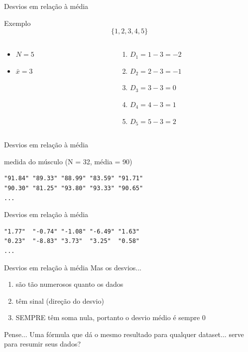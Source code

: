 \documentclass{beamer}
\begin{document}
\begin{frame}{\scriptsize Desvios em relação à média}
\begin{exampleblock}{Exemplo}
    \footnotesize
  \begin{displaymath}
    \{1,2,3,4,5\}
  \end{displaymath}

  \begin{columns}
    \begin{column}{5cm}
  \begin{itemize}
    \footnotesize
  \item $N=5$
  \item $\bar{x} = 3$
  \end{itemize}
\end{column}
\begin{column}{5cm}
  \begin{enumerate}
    \footnotesize
  \item $D_1 = 1-3 = -2$
  \item $D_2 = 2-3 = -1$
  \item $D_3 = 3-3 = 0$
  \item $D_4 = 4-3 = 1$
  \item $D_5 = 5-3 = 2$
  \end{enumerate}
\end{column}
\end{columns}
\end{exampleblock}
\end{frame}

\begin{frame}[fragile]{\scriptsize Desvios em relação à média}
  \begin{block}{medida do músculo (N = 32, média = 90)}
    \footnotesize
\begin{verbatim}
"91.84" "89.33" "88.99" "83.59" "91.71"
"90.30" "81.25" "93.80" "93.33" "90.65"
...
\end{verbatim}
  \end{block}
  \begin{block}{Desvios em relação à média}
    \footnotesize
\begin{verbatim}
"1.77"  "-0.74" "-1.08" "-6.49" "1.63"
"0.23"  "-8.83" "3.73"  "3.25"  "0.58"
...
\end{verbatim}
  \end{block}
\end{frame}

\begin{frame}{\scriptsize Desvios em relação à média}
  Mas os desvios...
  \begin{enumerate}
    \footnotesize
  \item são tão numerosos quanto os dados
  \item têm sinal (direção do desvio)
  \item SEMPRE têm soma \alert{nula}, portanto o desvio médio é sempre 0
  \end{enumerate}
  \begin{block}{Pense...}
    \footnotesize
    Uma fórmula que dá o mesmo resultado para qualquer dataset... serve para resumir seus dados?
  \end{block}
\end{frame}
\end{document}

